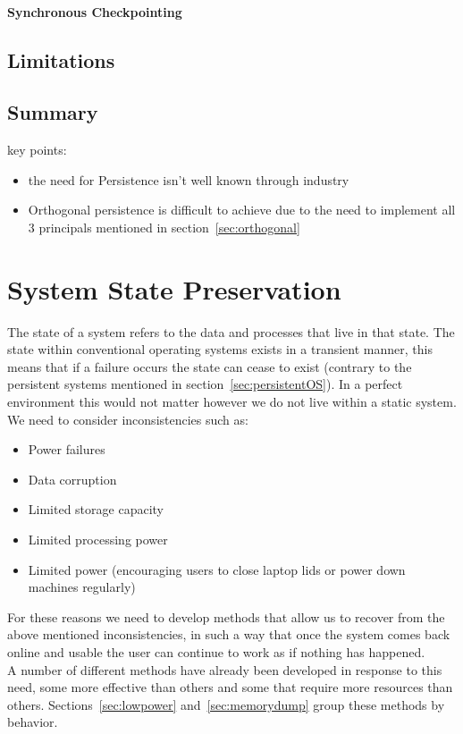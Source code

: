 \documentclass[a4paper,12pt]{article}
\begin{document}
\paragraph{Synchronous Checkpointing}
\par
\subsection{Limitations}\label{sec:limitations}
\subsection{Summary}
key points:
\begin{itemize}
    \item{the need for Persistence isn't well known through industry}
    \item{Orthogonal persistence is difficult to achieve due to the need to implement all 3 principals mentioned in section~\ref{sec:orthogonal}}
\end{itemize}
\section{System State Preservation}\label{sec:preservation}
The state of a system refers to the data and processes that live in that state. The state within conventional operating systems exists in a transient manner, this means that if a failure occurs the state can cease to exist (contrary to the persistent systems mentioned in section~\ref{sec:persistentOS}). In a perfect environment this would not matter however we do not live within a static system. We need to consider inconsistencies such as:
\begin{itemize}
    \item{Power failures}
    \item{Data corruption}
    \item{Limited storage capacity}
    \item{Limited processing power}
    \item{Limited power (encouraging users to close laptop lids or power down machines regularly)}
\end{itemize}
For these reasons we need to develop methods that allow us to recover from the above mentioned inconsistencies, in such a way that once the system comes back online and usable the user can continue to work as if nothing has happened.
\\A number of different methods have already been developed in response to this need, some more effective than others and some that require more resources than others. Sections~\ref{sec:lowpower} and~\ref{sec:memorydump} group these methods by behavior.
\end{document}
